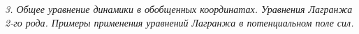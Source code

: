 \emph{3. Общее уравнение динамики в обобщенных координатах. Уравнения Лагранжа
2-го рода. Примеры применения уравнений Лагранжа в потенциальном поле сил.}

\newpage

